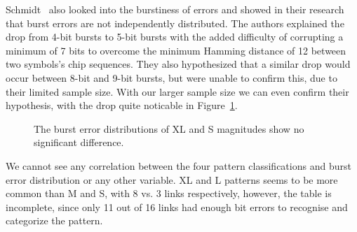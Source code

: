 Schmidt~\etal{} also looked into the burstiness of errors and showed in their research that burst errors are not independently distributed.
The authors explained the drop from 4-bit bursts to 5-bit bursts with the added difficulty of corrupting a minimum of 7 bits to overcome the minimum Hamming distance of 12 between two symbols's chip sequences.
They also hypothesized that a similar drop would occur between 8-bit and 9-bit bursts, but were unable to confirm this, due to their limited sample size.
With our larger sample size we can even confirm their hypothesis, with the drop quite noticable in Figure~\ref{fig:8mote_burst_error}.

\begin{figure}[H]
	\caption{The burst error distributions of XL and S magnitudes show no significant difference.}
	\label{fig:8mote_burst_error}
\end{figure}

We cannot see any correlation between the four pattern classifications and burst error distribution or any other variable.
XL and L patterns seems to be more common than M and S, with 8 vs. 3 links respectively, however, the table is incomplete, since only 11 out of 16 links had enough bit errors to recognise and categorize the pattern.

